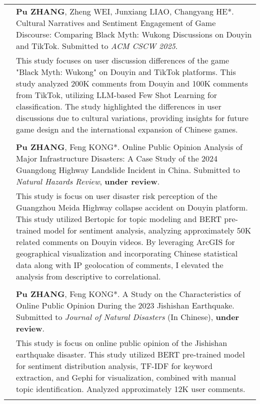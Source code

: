 \documentclass[letterpaper, 11pt]{article}
\begin{document}
\begin{longtable}{p{1.3in}p{4.8in}}
& \textbf{Pu ZHANG}, Zheng WEI, Junxiang LIAO, Changyang HE*. Cultural Narratives and Sentiment Engagement of Game Discourse: Comparing Black Myth: Wukong Discussions on Douyin and TikTok. Submitted to \textit{ACM CSCW 2025}.\\
& This study focuses on user discussion differences of the game "Black Myth: Wukong" on Douyin and TikTok platforms. This study analyzed 200K comments from Douyin and 100K comments from TikTok, utilizing LLM-based Few Shot Learning for classification. The study highlighted the differences in user discussions due to cultural variations, providing insights for future game design and the international expansion of Chinese games.\\
& \\

& \textbf{Pu ZHANG}, Feng KONG*. Online Public Opinion Analysis of Major Infrastructure Disasters: A Case Study of the 2024 Guangdong Highway Landslide Incident in China. Submitted to \textit{Natural Hazards Review}, \textbf{under review}.\\
& This study is focus on user disaster risk perception of the Guangzhou Meida Highway collapse accident on Douyin platform. This study utilized Bertopic for topic modeling and BERT pre-trained model for sentiment analysis, analyzing approximately 50K related comments on Douyin videos. By leveraging ArcGIS for geographical visualization and incorporating Chinese statistical data along with IP geolocation of comments, I elevated the analysis from descriptive to correlational. \\ 
& \\

& \textbf{Pu ZHANG}, Feng KONG*. A Study on the Characteristics of Online Public Opinion During the 2023 Jishishan Earthquake. Submitted to \textit{Journal of Natural Disasters} (In Chinese), \textbf{under review}.\\
& This study is focus on online public opinion of the Jishishan earthquake disaster. This study utilized BERT pre-trained model for sentiment distribution analysis, TF-IDF for keyword extraction, and Gephi for visualization, combined with manual topic identification. Analyzed approximately 12K user comments.\\
& \\



\end{longtable}
\end{document}
